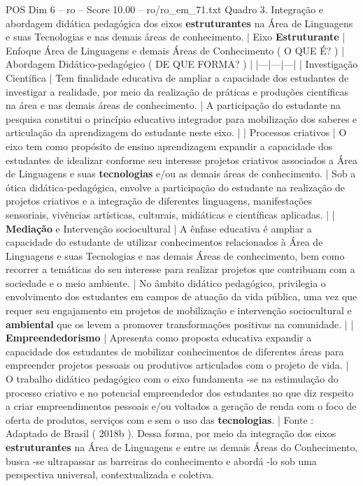 \begin{textsample}{POS Dim 6 – ro – Score 10.00 – ro/ro\_em\_71.txt}
Quadro 3.
Integração e abordagem didática pedagógica dos eixos \textbf{estruturantes} na Área de Linguagens e suas Tecnologias e nas demais áreas de conhecimento. | Eixo \textbf{Estruturante} | Enfoque Área de Linguagens e demais Áreas de Conhecimento ( O QUE É? ) | Abordagem Didático-pedagógico ( DE QUE FORMA? ) | |---|---|---| | Investigação Científica | Tem finalidade educativa de ampliar a capacidade dos estudantes de investigar a realidade, por meio da realização de práticas e produções científicas na área e nas demais áreas de conhecimento. | A participação do estudante na pesquisa constitui o princípio educativo integrador para mobilização dos saberes e articulação da aprendizagem do estudante neste eixo. | | Processos criativos | O eixo tem como propósito de ensino aprendizagem expandir a capacidade dos estudantes de idealizar conforme seu interesse projetos criativos associados a Área de Linguagens e suas \textbf{tecnologias} e/ou as demais áreas de conhecimento. | Sob a ótica didática-pedagógica, envolve a participação do estudante na realização de projetos criativos e a integração de diferentes linguagens, manifestações sensoriais, vivências artísticas, culturais, midiáticas e científicas aplicadas. | | \textbf{Mediação} e Intervenção sociocultural | A ênfase educativa é ampliar a capacidade do estudante de utilizar conhecimentos relacionados à Área de Linguagens e suas Tecnologias e nas demais Áreas de conhecimento, bem como recorrer a temáticas do seu interesse para realizar projetos que contribuam com a sociedade e o meio ambiente. | No âmbito didático pedagógico, privilegia o envolvimento dos estudantes em campos de atuação da vida pública, uma vez que requer seu engajamento em projetos de mobilização e intervenção sociocultural e \textbf{ambiental} que os levem a promover transformações positivas na comunidade. | | \textbf{Empreendedorismo} | Apresenta como proposta educativa expandir a capacidade dos estudantes de mobilizar conhecimentos de diferentes áreas para empreender projetos pessoais ou produtivos articulados com o projeto de vida. | O trabalho didático pedagógico com o eixo fundamenta -se na estimulação do processo criativo e no potencial empreendedor dos estudantes no que diz respeito a criar empreendimentos pessoais e/ou voltados a geração de renda com o foco de oferta de produtos, serviços com e sem o uso das \textbf{tecnologias}. | Fonte : Adaptado de Brasil ( 2018b ).
Dessa forma, por meio da integração dos eixos \textbf{estruturantes} na Área de Linguagens e entre as demais Áreas do Conhecimento, busca -se ultrapassar as barreiras do conhecimento e abordá -lo sob uma perspectiva universal, contextualizada e coletiva.

\end{textsample}
